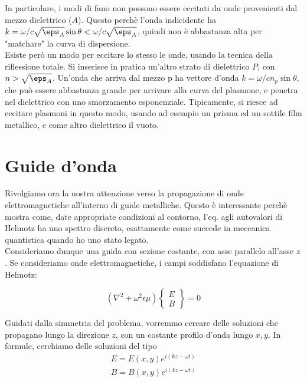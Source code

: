 \documentclass{report}
\begin{document}
In particolare, i modi di fano non possono essere eccitati da onde provenienti dal mezzo dielettrico (\(A\)). Questo perchè l'onda indicidente ha \(k = \omega/c \sqrt{\eps_A}\sin\theta < \omega/c \sqrt{\eps_A}\), quindi non è abbastanza alta per "matchare" la curva di dispersione. \\
Esiste però un modo per eccitare lo stesso le onde, usando la tecnica della riflessione totale. Si inserisce in pratica un'altro strato di dielettrico \(P\), con \(n > \sqrt{\eps_A}\). Un'onda che arriva dal mezzo p ha vettore d'onda \(k = \omega/c n_p \sin\theta\), che può essere abbastanza grande per arrivare alla curva del plasmone, e penetra nel dielettrico con uno smorzamento esponenziale. Tipicamente, si riesce ad eccitare plasmoni in questo modo, usando ad esempio un prisma ed un sottile film metallico, e come altro dielettrico il vuoto.  

\section{Guide d'onda}

    Rivolgiamo ora la nostra attenzione verso la propagazione di onde elettromagnetiche all'interno di guide metalliche. Questo è interessante perchè mostra come, date appropriate condizioni al contorno, l'eq. agli autovalori di Helmotz ha uno spettro discreto, esattamente come succede in meccanica quantistica quando ho uno stato legato. \\

    Consideriamo dunque una guida con sezione costante, con asse parallelo all'asse $z$. Se consideriamo onde elettromagnetiche, i campi soddisfano l'equazione di Helmotz: 

    \begin{equation}
        \left(\nabla^2 + \omega^2 \epsilon\mu \right) \left\{\begin{matrix}
            E \\ B 
        \end{matrix} \right\}
         = 0
    \end{equation}

    Guidati dalla simmetria del problema, vorremmo cercare delle soluzioni che propagano lungo la direzione $z$, con un costante profilo d'onda lungo $x,y$. In formule, cerchiamo delle soluzioni del tipo 
    \begin{align}
        E = E(x, y)e^{i(kz - \omega t)} \\ B = B(x, y)e^{i(kz - \omega t)} 
    \end{align}
\end{document}
